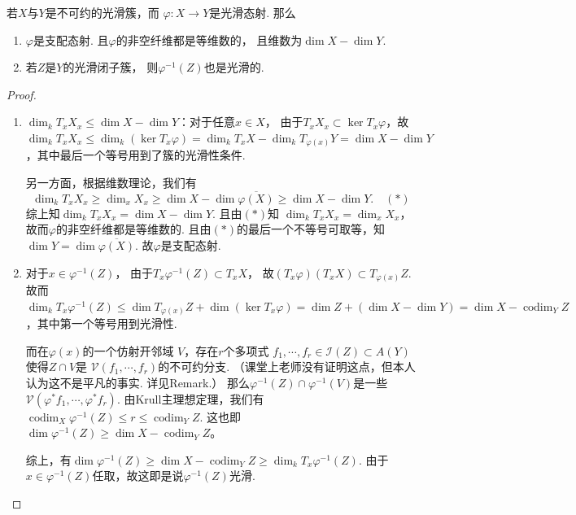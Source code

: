     \begin{proposition}
        若$X$与$Y$是不可约的光滑簇，而
        $\varphi\colon X \rightarrow Y$是光滑态射. 那么
        \begin{enumerate}
            \item[(1)] $\varphi$是支配态射. 且$\varphi$的非空纤维都是等维数的，
            且维数为$\dim X - \dim Y$.
            \item[(2)] 若$Z$是$Y$的光滑闭子簇，
            则$\varphi^{-1}(Z)$也是光滑的.
        \end{enumerate}
    \end{proposition}
    \begin{proof}
        \begin{enumerate}
            \item[(1)] 
            $\dim_{k}T_{x}X_{x} \leq \dim X - \dim Y$：对于任意$x \in X$，
            由于$T_{x}X_{x} \subset \ker T_{x}\varphi$，故
            $\dim_{k} T_{x}X_{x} \leq \dim_{k}(\ker T_{x}\varphi)=
            \dim_{k} T_{x} X - \dim_{k} T_{\varphi(x)} Y 
            = \dim X - \dim Y$，其中最后一个等号用到了簇的光滑性条件. \par
            另一方面，根据维数理论，我们有
            $$
            \dim_{k}T_{x}X_{x} \geq \dim_{x}X_{x} \geq
            \dim X - \dim \overline{\varphi(X)} \geq \dim X - \dim Y. \quad(*)
            $$
            综上知$\dim_{k}T_{x}X_{x} = \dim X - \dim Y$. 且由$(*)$知
            $\dim_{k}T_{x}X_{x}=\dim_{x} X_{x}$，故而$\varphi$的非空纤维都是等维数的.
            且由$(*)$的最后一个不等号可取等，知$\dim Y =\dim \overline{\varphi(X)}$.
            故$\varphi$是支配态射.
            
            \item[(2)]
            对于$x \in \varphi^{-1}(Z)$，
            由于$T_{x}\varphi^{-1}(Z) \subset T_{x}X$，
            故$(T_{x}\varphi)(T_{x}X) \subset T_{\varphi(x)}Z$.
            故而$\dim_{k}T_{x}\varphi^{-1}(Z) \leq 
            \dim T_{\varphi(x)}Z + \dim(\ker T_{x}\varphi)
            =\dim Z + (\dim X - \dim Y) = \dim X - \operatorname{codim}_{Y}Z$，其中第一个等号用到光滑性. \par
            
            而在$\varphi(x)$的一个仿射开邻域 $V$，存在$r$个多项式
            $f_{1},\cdots,f_{r} \in \mathcal{I}(Z) \subset A(Y)$使得$Z\cap V$是
            $\mathcal{V}(f_{1},\cdots,f_{r})$的不可约分支.
            （课堂上老师没有证明这点，但本人认为这不是平凡的事实. 详见Remark.）
            那么$\varphi^{-1}(Z)\cap \varphi^{-1}(V)$是一些
            $\mathcal{V}(\varphi^{*}f_{1},\cdots,\varphi^{*}f_{r})$.
            由Krull主理想定理，我们有
            $\operatorname{codim}_{X}\varphi^{-1}(Z) \leq r \leq \operatorname{codim} _{Y} Z$.
            这也即$\dim \varphi^{-1}(Z) \geq \dim X - \operatorname{codim}_{Y}Z$。

            综上，有$\dim \varphi^{-1}(Z) \geq \dim X - \operatorname{codim}_{Y}Z \geq \dim_{k}T_{x}\varphi^{-1}(Z)$.
            由于$x \in \varphi^{-1}(Z)$任取，故这即是说$\varphi^{-1}(Z)$光滑.\qedhere

        \end{enumerate}
    \end{proof}

